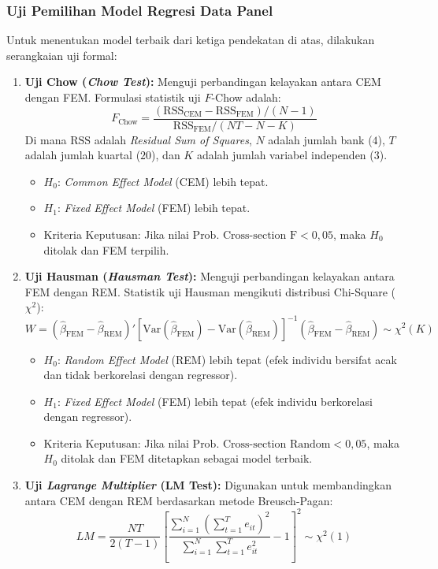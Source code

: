 \documentclass[12pt,a4paper]{article}
\numberwithin{equation}{section}
\begin{document}
\subsubsection{Uji Pemilihan Model Regresi Data Panel}
\noindent
Untuk menentukan model terbaik dari ketiga pendekatan di atas, dilakukan serangkaian uji formal:
\begin{enumerate}
  \item \textbf{Uji Chow (\emph{Chow Test}):} Menguji perbandingan kelayakan antara CEM dengan FEM. Formulasi statistik uji $F$-Chow adalah:
    \begin{equation}
      F_{\text{Chow}} = \frac{(\text{RSS}_{\text{CEM}} - \text{RSS}_{\text{FEM}}) / (N - 1)}{\text{RSS}_{\text{FEM}} / (NT - N - K)}
    \end{equation}
    Di mana $\text{RSS}$ adalah \emph{Residual Sum of Squares}, $N$ adalah jumlah bank ($4$), $T$ adalah jumlah kuartal ($20$), dan $K$ adalah jumlah variabel independen ($3$).
    \begin{itemize}
      \item $H_0$: \emph{Common Effect Model} (CEM) lebih tepat.
      \item $H_1$: \emph{Fixed Effect Model} (FEM) lebih tepat.
      \item Kriteria Keputusan: Jika nilai $\text{Prob. Cross-section F} < 0{,}05$, maka $H_0$ ditolak dan FEM terpilih.
    \end{itemize}
  \item \textbf{Uji Hausman (\emph{Hausman Test}):} Menguji perbandingan kelayakan antara FEM dengan REM. Statistik uji Hausman mengikuti distribusi Chi-Square ($\chi^2$):
    \begin{equation}
      W = (\hat{\beta}_{\text{FEM}} - \hat{\beta}_{\text{REM}})' \left[ \text{Var}(\hat{\beta}_{\text{FEM}}) - \text{Var}(\hat{\beta}_{\text{REM}}) \right]^{-1} (\hat{\beta}_{\text{FEM}} - \hat{\beta}_{\text{REM}}) \sim \chi^2(K)
    \end{equation}
    \begin{itemize}
      \item $H_0$: \emph{Random Effect Model} (REM) lebih tepat (efek individu bersifat acak dan tidak berkorelasi dengan regressor).
      \item $H_1$: \emph{Fixed Effect Model} (FEM) lebih tepat (efek individu berkorelasi dengan regressor).
      \item Kriteria Keputusan: Jika nilai $\text{Prob. Cross-section Random} < 0{,}05$, maka $H_0$ ditolak dan FEM ditetapkan sebagai model terbaik.
    \end{itemize}
  \item \textbf{Uji \emph{Lagrange Multiplier} (LM Test):} Digunakan untuk membandingkan antara CEM dengan REM berdasarkan metode Breusch-Pagan:
    \begin{equation}
      LM = \frac{NT}{2(T-1)} \left[ \frac{\sum_{i=1}^N \left( \sum_{t=1}^T e_{it} \right)^2}{\sum_{i=1}^N \sum_{t=1}^T e_{it}^2} - 1 \right]^2 \sim \chi^2(1)
    \end{equation}
\end{enumerate}
\end{document}
